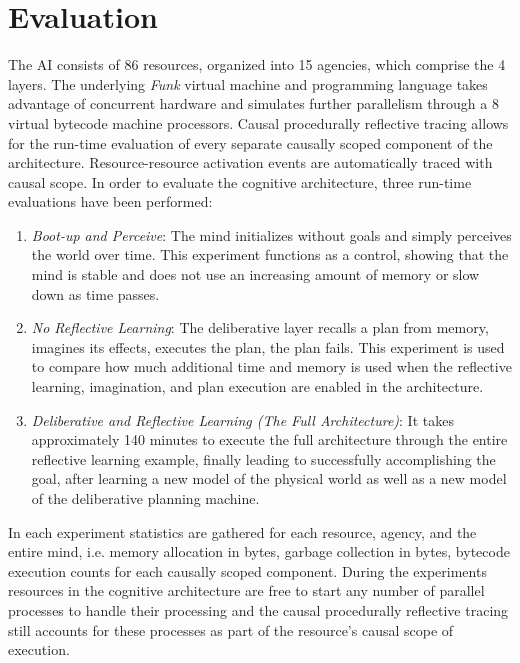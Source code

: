 \chapter{Evaluation}
\label{chapter:evaluation}

The AI consists of 86 resources, organized into 15 agencies, which
comprise the 4 layers.  The underlying \emph{Funk} virtual machine and
programming language \cite[]{morgan:2009} takes advantage of
concurrent hardware and simulates further parallelism through a 8
virtual bytecode machine processors.  Causal procedurally reflective
tracing allows for the run-time evaluation of every separate causally
scoped component of the architecture.  Resource-resource activation
events are automatically traced with causal scope.  In order to
evaluate the cognitive architecture, three run-time evaluations have
been performed:
\begin{enumerate}
\item \emph{Boot-up and Perceive}: The mind initializes without goals
  and simply perceives the world over time.  This experiment functions
  as a control, showing that the mind is stable and does not use an
  increasing amount of memory or slow down as time passes.
\item \emph{No Reflective Learning}: The deliberative layer recalls a
  plan from memory, imagines its effects, executes the plan, the plan
  fails.  This experiment is used to compare how much additional time
  and memory is used when the reflective learning, imagination, and
  plan execution are enabled in the architecture.
\item \emph{Deliberative and Reflective Learning (The Full
  Architecture)}: It takes approximately 140 minutes to execute the
  full architecture through the entire reflective learning example,
  finally leading to successfully accomplishing the goal, after
  learning a new model of the physical world as well as a new model of
  the deliberative planning machine.
\end{enumerate}

In each experiment statistics are gathered for each resource, agency,
and the entire mind, i.e. memory allocation in bytes, garbage
collection in bytes, bytecode execution counts for each causally
scoped component.  During the experiments resources in the cognitive
architecture are free to start any number of parallel processes to
handle their processing and the causal procedurally reflective tracing
still accounts for these processes as part of the resource's causal
scope of execution.

